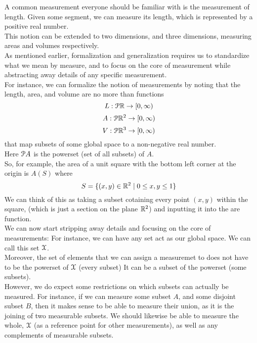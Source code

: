 \documentclass[12pt]{article}
\begin{document}
    A common measurement everyone should be
    familiar with is the measurement of length.
    Given some segment, 
    we can measure its length,
    which is represented by a positive real number. \\
    This notion can be extended to two dimensions,
    and three dimensions,
    measuring areas and volumes respectively. \\
    
    As mentioned earlier,
    formalization and generalization
    requires us to standardize what we mean by measure,
    and to focus on the core of measurement
    while abstracting away details of any specific
    measurement. \\

    For instance,
    we can formalize the notion of measurements
    by noting that the length,
    area, and volume are no more than functions
    \[ L:\mathcal{P}{\mathbb{R}} \to [0, \infty) \]    
    \[ A:\mathcal{P}{\mathbb{R}^2} \to [0, \infty) \]
    \[ V:\mathcal{P}{\mathbb{R}^3} \to [0, \infty) \]
    that map subsets of some global space
    to a non-negative real number. \\
    Here $\mathcal{P}{A}$ is the powerset 
    (set of all subsets) of $A$. \\
    So, for example,
    the area of a unit square
    with the bottom left corner at the origin
    is $A(S)$ where 
    \[ S = \{ (x, y) \in \mathbb{R}^2 \mid 
    0 \leq x, y \leq 1  \} \]
    We can think of this as taking a subset cotaining
    every point $(x, y)$ within the square,
    (which is just a section on the plane $\mathbb{R}^2$)
    and inputting it into the are function. \\

    We can now start stripping away details
    and focusing on the core of measurements:
    For instance, we can have any set act
    as our global space.
    We can call this set $\mathcal{X}$. \\
    Moreover, the set of elements that we can
    assign a measuremet to does not have to be
    the powerset of $\mathcal{X}$ (every subset)
    It can be a subset of the powerset
    (some subsets). \\

    However, we do expect some restrictions
    on which subsets can actually be measured.
    For instance, if we can measure some
    subset $A$, and some disjoint subset $B$,
    then it makes sense to be able to measure
    their union, as it is the joining of two
    measurable subsets.
    We should likewise be able to measure the whole,
    $\mathcal{X}$ (as a reference point for
    other measurements),
    as well as any complements of measurable subsets. \\
\end{document}
